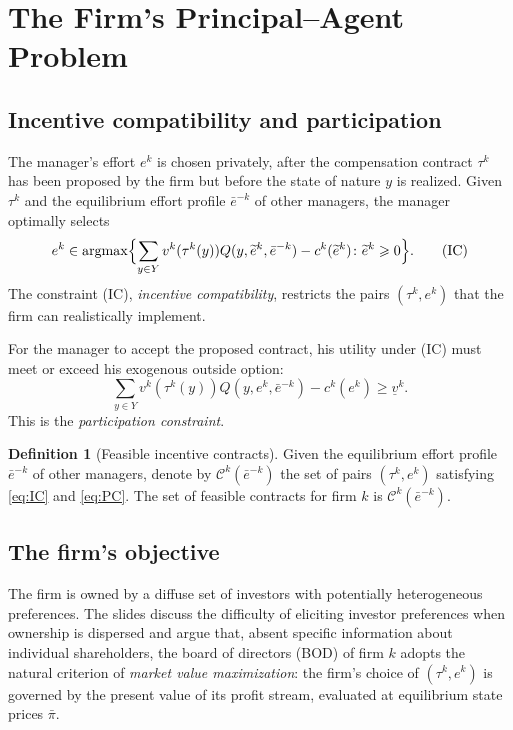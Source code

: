 \documentclass[11pt,a4paper,oneside]{book}
\def\geq{\geqslant}
\DeclareMathOperator*{\argmax}{argmax}
\theoremstyle{plain}
\theoremstyle{definition}
\newtheorem{definition}[theorem]{Definition}
\theoremstyle{remark}
\numberwithin{equation}{chapter}
\begin{document}
\section{The Firm's Principal--Agent Problem}
\label{sec:MQ08-PA}

\subsection{Incentive compatibility and participation}

The manager's effort $e^k$ is chosen privately, after the compensation contract $\tau^k$ has been proposed by the firm but before the state of nature $y$ is realized.
Given $\tau^k$ and the equilibrium effort profile $\bar{e}^{-k}$ of other managers, the manager optimally selects
\begin{equation*}
  e^k \in \argmax \Bigl\{ \sum_{y \in Y} v^k(\tau^k(y)) Q(y, \widetilde{e}^k, \bar{e}^{-k}) - c^k(\widetilde{e}^k) \colon \widetilde{e}^k \geq 0 \Bigr\}.
  \tag{IC}\label{eq:IC}
\end{equation*}
The constraint (IC), \emph{incentive compatibility}, restricts the pairs $(\tau^k, e^k)$ that the firm can realistically implement.

For the manager to accept the proposed contract, his utility under (IC) must meet or exceed his exogenous outside option:
\begin{equation*}
  \sum_{y \in Y} v^k(\tau^k(y)) Q(y, e^k, \bar{e}^{-k}) - c^k(e^k) \geq \underline{v}^k.
  \tag{PC}\label{eq:PC}
\end{equation*}
This is the \emph{participation constraint}.

\begin{definition}[Feasible incentive contracts]\label{def:feasible-contracts}
Given the equilibrium effort profile $\bar{e}^{-k}$ of other managers, denote by $\mathcal{C}^k(\bar{e}^{-k})$ the set of pairs $(\tau^k, e^k)$ satisfying \eqref{eq:IC} and \eqref{eq:PC}.
The set of feasible contracts for firm $k$ is $\mathcal{C}^k(\bar{e}^{-k})$.
\end{definition}

\subsection{The firm's objective}

The firm is owned by a diffuse set of investors with potentially heterogeneous preferences.
The slides discuss the difficulty of eliciting investor preferences when ownership is dispersed and argue that, absent specific information about individual shareholders, the board of directors (BOD) of firm $k$ adopts the natural criterion of \emph{market value maximization}: the firm's choice of $(\tau^k, e^k)$ is governed by the present value of its profit stream, evaluated at equilibrium state prices $\bar{\pi}$.
\end{document}
